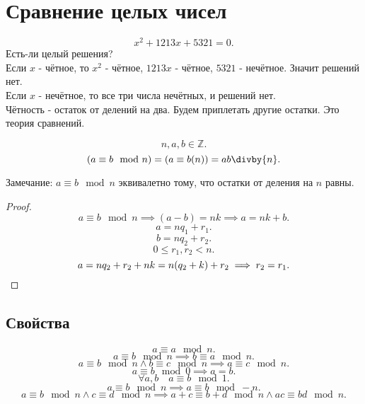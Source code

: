\documentclass[11pt, oneside]{article}   	%
\begin{document}
\section{Сравнение целых чисел}
\[ x^2+1213x+5321=0 .\]
Есть-ли целый решения?\\
Если $x$ - чётное, то  $x^2$ - чётное, $1213x$ - чётное,  $5321$ - нечётное. Значит решений нет.\\
Если  $x$ - нечётное, то все три числа нечётных, и решений нет.\\
Чётность - остаток от делений на два. Будем приплетать другие остатки. Это теория сравнений. 
\begin{definition}
\[n, a, b \in \mathbb{Z}.\]
\[ (a\equiv b\mod n)=(a\equiv b(n)) = ab\divby{n} .\]
\end{definition}
Замечание: $a \equiv b\mod n$ эквивалетно тому, что остатки от деления на $n$ равны.
 \begin{proof}
     \[ a\equiv b\mod n \implies (a-b)=nk \implies a=nk+b .\]
     \[ a=nq_1+r_1 .\]
     \[ b=nq_2+r_2 .\]
     \[ 0 \le r_1, r_2 < n .\]
     \[ a = nq_2+r_2+nk = n(q_2+k)+r_2 \implies r_2=r_1.\qedhere\]
\end{proof}
\subsection{Свойства}
    \[ a\equiv a\mod n .\]
    \[ a \equiv b\mod n \implies b\equiv a\mod n .\]
    \[ a \equiv b\mod n\land b \equiv c\mod n \implies a\equiv c \mod n .\]
    \[ a\equiv b\mod 0 \implies a=b.\]
    \[ \forall{a, b}\quad a \equiv b \mod 1 .\]
    \[ a\equiv b\mod n \implies a\equiv b\mod -n .\]
    \[ a \equiv b\mod n\land c\equiv d \mod n \implies a+c\equiv b+d\mod n\land ac\equiv bd\mod n .\] 
\end{document}
